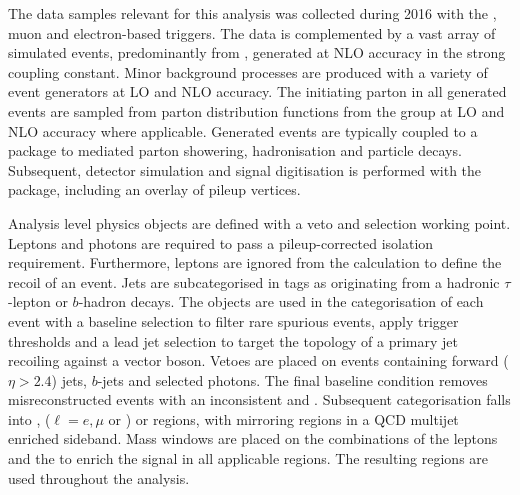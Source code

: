 The data samples relevant for this analysis was collected during 2016 with the
\ptmiss, muon and electron-based triggers. The data is complemented by a vast
array of simulated events, predominantly from \IVj, generated at NLO accuracy
in the strong coupling constant. Minor background processes are produced with
a variety of event generators at LO and NLO accuracy. The initiating parton in
all generated events are sampled from parton distribution functions from the
\NNPDF group at LO and NLO accuracy where applicable. Generated events are
typically coupled to a package to mediated parton showering, hadronisation and
particle decays. Subsequent, detector simulation and signal digitisation is
performed with the \GEANT package, including an overlay of pileup vertices.

Analysis level physics objects are defined with a veto and selection working
point. Leptons and photons are required to pass a pileup-corrected isolation
requirement. Furthermore, leptons are ignored from the \ptmiss calculation to
define the recoil of an event. Jets are subcategorised in tags as originating
from a hadronic $\tau$-lepton or $b$-hadron decays. The objects are used in the
categorisation of each event with a baseline selection to filter rare spurious
\ptmiss events, apply trigger thresholds and a lead jet selection to target
the topology of a primary jet recoiling against a vector boson. Vetoes are
placed on events containing forward (${\eta>2.4}$) jets, $b$-jets and selected
photons. The final baseline condition removes misreconstructed events with an
inconsistent \ptmiss and \ptmisscalo. Subsequent categorisation falls into
\metplusjets, \ellplusjets ($\ell=e,\mu$ or \Ptauh) or \diellplusjets regions,
with mirroring regions in a QCD multijet enriched sideband. Mass windows are
placed on the combinations of the leptons and the \ptmiss to enrich the signal
in all applicable regions. The resulting regions are used throughout the
analysis.